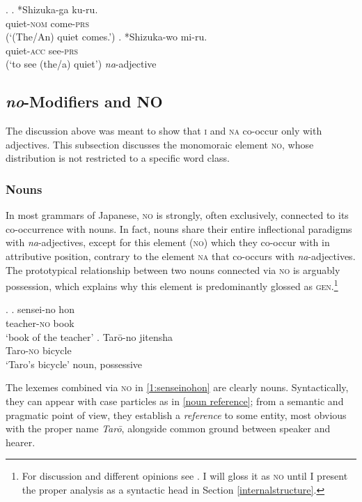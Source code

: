 \ex. \ag. *Shizuka-ga ku-ru.\\
quiet-\textsc{nom} come-\textsc{prs}\\
(`(The/An) quiet comes.’)
\bg. *Shizuka-wo mi-ru.\\
quiet-\textsc{acc} see-\textsc{prs}\\
(`to see (the/a) quiet’) \null \hfill \textit{na}-adjective

\subsection{\textit{no}-Modifiers and \textsc{NO}}

The discussion above was meant to show that \textsc{i} and \textsc{na} co-occur only with adjectives. This subsection discusses the monomoraic element \textsc{no}, whose distribution is not restricted to a specific word class.

\subsubsection{Nouns}

In most grammars of Japanese, \textsc{no} is strongly, often exclusively, connected to its co-occurrence with nouns. In fact, nouns share their entire inflectional paradigms with \textit{na}-adjectives, except for this element (\textsc{no}) which they co-occur with in attributive position, contrary to the element \textsc{na} that co-occurs with \textit{na}-adjectives. The prototypical relationship between two nouns connected via \textsc{no} is arguably possession, which explains why this element is predominantly glossed as \textsc{gen}.\footnote{For discussion and different opinions see \citet{murasugi:1991:noun, uehara:1998:syntactic, backhouse:2004:inflected}. I will gloss it as \textsc{no} until I present the proper analysis as a syntactic head in Section \ref{internalstructure}.}

\ex. \label{1:senseinohon} \ag. sensei-no hon\\
teacher-\textsc{no} book\\
`book of the teacher'
\bg. Tarō-no jitensha\\
Taro-\textsc{no} bicycle\\
`Taro’s bicycle’ \null \hfill noun, possessive

The lexemes combined via \textsc{no} in \ref{1:senseinohon} are clearly nouns. Syntactically, they can appear with case particles as in \ref{noun reference}; from a semantic and pragmatic point of view, they establish a \textit{reference} to some entity, most obvious with the proper name \textit{Tarō}, alongside common ground between speaker and hearer.

